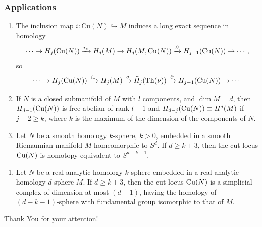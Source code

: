\documentclass{beamer}
\newcounter{saveenumi}
\newcommand{\seti}{\setcounter{saveenumi}{\value{enumi}}}
\newcommand{\conti}{\setcounter{enumi}{\value{saveenumi}}}
\begin{document}
	\begin{frame}
		\frametitle<presentation>{Applications}
		\begin{enumerate}
			\p \item The inclusion map $i:\mathrm{Cu}(N)\hookrightarrow M$  induces a long exact sequence in homology \p
			\begin{displaymath}
				\cdots \to H_j(\mathrm{Cu}(N)) \xrightarrow{i_*}H_j(M) \to H_j(M,\mathrm{Cu}(N)) \xrightarrow{\partial} H_{j-1}(\mathrm{Cu}(N)) \to \cdots,
			\end{displaymath}
			\p so 
			\begin{displaymath}
				\cdots \to H_j(\mathrm{Cu}(N)) \xrightarrow{i_*}H_j(M) \xrightarrow{q} \tilde{H}_j(\mathrm{Th}(\nu)) \xrightarrow{\partial} H_{j-1}(\mathrm{Cu}(N)) \to \cdots 
			\end{displaymath}
			\p \item If $N$ is a closed submanifold of $M$ with $l$ components, and $\dim M =d$, \p then $H_{d-1}(\mathrm{Cu}(N))$ is free abelian of rank $l-1$ and $H_{d-j}(\mathrm{Cu}(N))\equiv H^j(M)$ if $j-2\ge k$, where $k$ is the maximum of the dimension of the components of $N$.

			\p \item Let $N$ be a smooth homology $k$-sphere, $k>0$, embedded in a smooth Riemannian manifold $M$ homeomorphic to $S^d$. \p  If $d\ge k+3$, then the cut locus $\mathrm{Cu}(N)$ is homotopy equivalent to $S^{d-k-1}$.
			\seti
		\end{enumerate}
	\end{frame}	

	\begin{frame}
		\begin{enumerate}
			\conti
			\item Let $N$ be a real analytic homology $k$-sphere embedded in a real analytic homology $d$-sphere $M$. If $d\ge k+3$, then the cut locus $\mathrm{Cu}(N)$ is a simplicial complex of dimension at most $(d-1)$, having the homology of $(d-k-1)$-sphere with fundamental group isomorphic to that of $M$.
		\end{enumerate}
	\end{frame}	

	\begin{frame}
		\huge{
		\begin{center}
			Thank You for your attention!
		\end{center}
		}
	\end{frame}	
\end{document}
